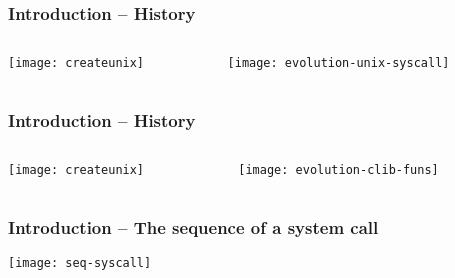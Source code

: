 \begin{frame}[plain]
	\frametitle{Introduction -- History}
	
	
	
	\begin{columns}
		
		\begin{column}{.2\textwidth}
			
			\texttt{[image: createunix]}
			
		\end{column}
		
		\begin{column}{.8\textwidth}
			
			\texttt{[image: evolution-unix-syscall]}

		\end{column}
		
		
	\end{columns}
	
	
\end{frame}

\begin{frame}[plain]
	\frametitle{Introduction -- History}
	
	
	
	\begin{columns}
		
		\begin{column}{.2\textwidth}
			
			\texttt{[image: createunix]}
			
		\end{column}
		
		\begin{column}{.8\textwidth}
			
			\texttt{[image: evolution-clib-funs]}
			
		\end{column}
		
		
	\end{columns}
	
	
\end{frame}

\begin{frame}[plain]
	\frametitle{Introduction -- The sequence of a system call}
	
	
	
			
			\texttt{[image: seq-syscall]}
			

	
\end{frame}


